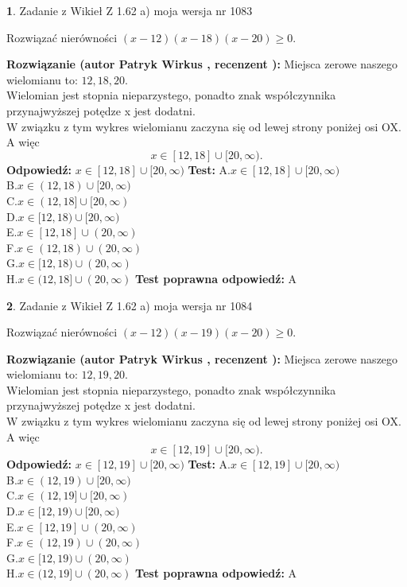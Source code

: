 \documentclass[12pt, a4paper]{article}
\theoremstyle{definition} %
\newtheorem{zad}{}
\newcommand{\zadStart}[1]{\begin{zad}#1\newline}
\newcommand{\zadStop}{\end{zad}}
\newcommand{\rozwStart}[2]{\noindent \textbf{Rozwiązanie (autor #1 , recenzent #2): }\newline}
\newcommand{\rozwStop}{\newline}
\newcommand{\odpStart}{\noindent \textbf{Odpowiedź:}\newline}
\newcommand{\odpStop}{\newline}
\newcommand{\testStart}{\noindent \textbf{Test:}\newline}
\newcommand{\testStop}{\newline}
\newcommand{\kluczStart}{\noindent \textbf{Test poprawna odpowiedź:}\newline}
\newcommand{\kluczStop}{\newline}
\begin{document}
\zadStart{Zadanie z Wikieł Z 1.62 a) moja wersja nr 1083}

Rozwiązać nierówności $(x-12)(x-18)(x-20)\ge0$.
\zadStop
\rozwStart{Patryk Wirkus}{}
Miejsca zerowe naszego wielomianu to: $12, 18, 20$.\\
Wielomian jest stopnia nieparzystego, ponadto znak współczynnika przy\linebreak najwyższej potędze x jest dodatni.\\ W związku z tym wykres wielomianu zaczyna się od lewej strony poniżej osi OX. A więc $$x \in [12,18] \cup [20,\infty).$$
\rozwStop
\odpStart
$x \in [12,18] \cup [20,\infty)$
\odpStop
\testStart
A.$x \in [12,18] \cup [20,\infty)$\\
B.$x \in (12,18) \cup [20,\infty)$\\
C.$x \in (12,18] \cup [20,\infty)$\\
D.$x \in [12,18) \cup [20,\infty)$\\
E.$x \in [12,18] \cup (20,\infty)$\\
F.$x \in (12,18) \cup (20,\infty)$\\
G.$x \in [12,18) \cup (20,\infty)$\\
H.$x \in (12,18] \cup (20,\infty)$
\testStop
\kluczStart
A
\kluczStop



\zadStart{Zadanie z Wikieł Z 1.62 a) moja wersja nr 1084}

Rozwiązać nierówności $(x-12)(x-19)(x-20)\ge0$.
\zadStop
\rozwStart{Patryk Wirkus}{}
Miejsca zerowe naszego wielomianu to: $12, 19, 20$.\\
Wielomian jest stopnia nieparzystego, ponadto znak współczynnika przy\linebreak najwyższej potędze x jest dodatni.\\ W związku z tym wykres wielomianu zaczyna się od lewej strony poniżej osi OX. A więc $$x \in [12,19] \cup [20,\infty).$$
\rozwStop
\odpStart
$x \in [12,19] \cup [20,\infty)$
\odpStop
\testStart
A.$x \in [12,19] \cup [20,\infty)$\\
B.$x \in (12,19) \cup [20,\infty)$\\
C.$x \in (12,19] \cup [20,\infty)$\\
D.$x \in [12,19) \cup [20,\infty)$\\
E.$x \in [12,19] \cup (20,\infty)$\\
F.$x \in (12,19) \cup (20,\infty)$\\
G.$x \in [12,19) \cup (20,\infty)$\\
H.$x \in (12,19] \cup (20,\infty)$
\testStop
\kluczStart
A
\kluczStop
\end{document}
